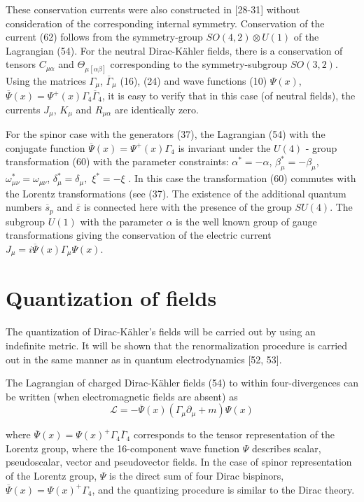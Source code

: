 \documentclass[a4paper,12pt]{article}
\begin{document}
These conservation currents were also constructed in [28-31] without
consideration of the corresponding internal symmetry. Conservation of the
current (62) follows from the symmetry-group $SO(4,2)\otimes U(1)$ of the
Lagrangian (54). For the neutral Dirac-K\"ahler fields, there is a
conservation of tensors $C_{\mu \alpha }$ and $\Theta _{\mu [\alpha \beta ]}$
corresponding to the symmetry-subgroup $SO(3,2).$ Using the matrices $\Gamma
_\mu $, $\overline{\Gamma }_\mu $ (16), (24) and wave functions (10) $\Psi
(x)$, $\overline{\Psi }(x)=\Psi ^{+}(x)\Gamma _4\overline{\Gamma }_4$, it is
easy to verify that in this case (of neutral fields), the currents $J_\mu $,
$K_\mu $ and $R_{\mu \alpha }$ are identically zero.

For the spinor case with the generators (37), the Lagrangian (54)
with the conjugate function $\overline{\Psi }(x)=\Psi
^{+}(x)\Gamma _4$ is invariant under the $U(4)$ - group
transformation (60) with the parameter constraints: $\alpha
^{*}=-\alpha $, $\beta _\mu ^{*}=-\beta _\mu $, $\omega _{\mu \nu
}^{*}=\omega _{\mu \nu }$, $\delta _\mu ^{*}=\delta _\mu ,$ $\xi
^{*}=-\xi $ . In this case the transformation (60) commutes with
the Lorentz transformations (see (37). The existence of the
additional quantum numbers $ \overline{s}_p$ and
$\overline{\varepsilon }$ is connected here with the presence of
the group $SU(4)$. The subgroup $U(1)$ with the parameter $ \alpha
$ is the well known group of gauge transformations giving the
conservation of the electric current $J_\mu =i\overline{\Psi
}(x)\Gamma _\mu \Psi (x)$.

\section{Quantization of fields}

The quantization of Dirac-K\"ahler's fields will be carried out by using an
indefinite metric. It will be shown that the renormalization procedure is
carried out in the same manner as in quantum electrodynamics [52, 53].

The Lagrangian of charged Dirac-K\"ahler fields (54) to within
four-divergences can be written (when electromagnetic fields are absent) as
\begin{equation}
\mathcal{L}=-\overline{\Psi }(x)\left( \Gamma _\mu \partial _\mu +m\right)
\Psi (x)  \label{63}
\end{equation}

where $\overline{\Psi }(x)=\Psi (x)^{+}\Gamma _4\overline{\Gamma
}_4$ corresponds to the tensor representation of the Lorentz
group, where the 16-component wave function $\Psi $ describes
scalar, pseudoscalar, vector and pseudovector fields. In the case
of spinor representation of the Lorentz group, $\Psi $ is the
direct sum of four Dirac bispinors, $\overline{\Psi } (x)=\Psi
(x)^{+}\Gamma _4$, and the quantizing procedure is similar to the
Dirac theory.
\end{document}
